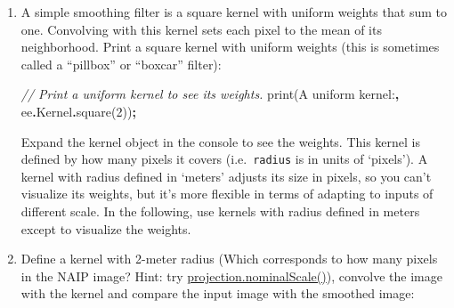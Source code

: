 \documentclass[
]{article}
\newenvironment{Shaded}{\begin{snugshade}}{\end{snugshade}}
\newcommand{\AttributeTok}[1]{\textcolor[rgb]{0.77,0.63,0.00}{#1}}
\newcommand{\CommentTok}[1]{\textcolor[rgb]{0.56,0.35,0.01}{\textit{#1}}}
\newcommand{\DecValTok}[1]{\textcolor[rgb]{0.00,0.00,0.81}{#1}}
\newcommand{\FunctionTok}[1]{\textcolor[rgb]{0.00,0.00,0.00}{#1}}
\newcommand{\NormalTok}[1]{#1}
\newcommand{\OperatorTok}[1]{\textcolor[rgb]{0.81,0.36,0.00}{\textbf{#1}}}
\newcommand{\StringTok}[1]{\textcolor[rgb]{0.31,0.60,0.02}{#1}}
\begin{document}
\begin{enumerate}
\def\labelenumi{\roman{enumi}.}
\item
  A simple smoothing filter is a square kernel with uniform weights that sum to one. Convolving with this kernel sets each pixel to the mean of its neighborhood. Print a square kernel with uniform weights (this is sometimes called a ``pillbox'' or ``boxcar'' filter):

\begin{Shaded}
\begin{Highlighting}[]
\CommentTok{// Print a uniform kernel to see its weights.}
\FunctionTok{print}\NormalTok{(}\StringTok{\textquotesingle{}A uniform kernel:\textquotesingle{}}\OperatorTok{,}\NormalTok{ ee}\OperatorTok{.}\AttributeTok{Kernel}\OperatorTok{.}\FunctionTok{square}\NormalTok{(}\DecValTok{2}\NormalTok{))}\OperatorTok{;}
\end{Highlighting}
\end{Shaded}

  Expand the kernel object in the console to see the weights. This kernel is defined by how many pixels it covers (i.e.~\texttt{radius} is in units of `pixels'). A kernel with radius defined in `meters' adjusts its size in pixels, so you can't visualize its weights, but it's more flexible in terms of adapting to inputs of different scale. In the following, use kernels with radius defined in meters except to visualize the weights.
\item
  Define a kernel with 2-meter radius (Which corresponds to how many pixels in the NAIP image? Hint: try \href{https://developers.google.com/earth-engine/guides/projections}{projection.nominalScale()}), convolve the image with the kernel and compare the input image with the smoothed image:


\end{enumerate}
\end{document}
